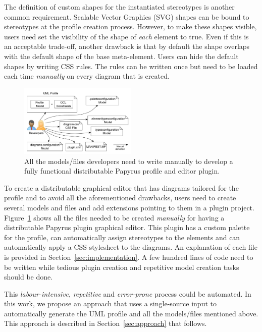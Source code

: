 
The definition of custom shapes for the instantiated stereotypes is another 
common requirement. Scalable Vector Graphics (SVG) shapes can be bound to 
stereotypes at the profile creation process. However, to make these shapes  
visible, users need set the visibility of the shape of \textit{each} element to true. Even if this is an 
acceptable trade-off, another drawback is that by default the shape overlaps 
with the default shape of the base meta-element. Users can hide the default 
shapes by writing CSS rules. The rules can 
be written once but need to be loaded each time \textit{manually} on every 
diagram that is created. 

\begin{figure}[t]
	\centering
	\includegraphics[width=0.5\textwidth]{diagrams/neededPapyrusFiles.pdf}
	\vspace{-3mm}
	\caption[]{All the models/files developers need to write manually to 
	develop a fully functional distributable Papyrus profile and editor plugin.}
	\label{fig:neededPapyrusFiles}
	\vspace*{-3mm}
\end{figure}

To create a distributable graphical editor that has diagrams tailored for the 
profile and to avoid all the aforementioned drawbacks, users need to create 
several models and files and add extensions pointing to them in a plugin 
project. Figure~\ref{fig:neededPapyrusFiles} shows all the files needed to be 
created \textit{manually} for having a distributable Papyrus plugin 
graphical editor. This plugin has a custom palette for the profile, can 
automatically assign stereotypes to the elements and can automatically 
apply a CSS stylesheet to the diagrams. 
An explanation of each file is provided in Section~\ref{sec:implementation}. A 
few hundred lines of code need to be written while tedious plugin creation and 
repetitive model creation tasks should be done. 


This \textit{labour-intensive}, \textit{repetitive} and \textit{error-prone} 
process could be automated. In this work, we propose an approach that uses a 
single-source input to automatically generate the UML profile and all the 
models/files mentioned above. This 
approach is described in Section~\ref{sec:approach} that follows. 
